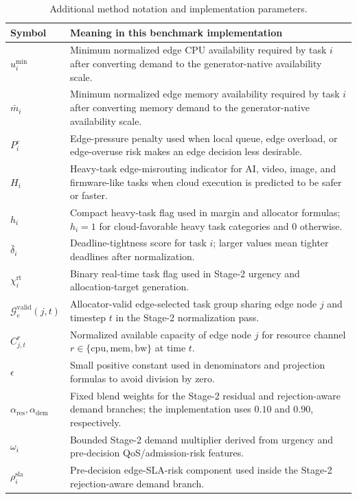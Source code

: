 \begin{table}[!t]
\centering
\caption{Additional method notation and implementation parameters.}
\label{tab:method_parameters}
\scriptsize
\begin{tabularx}{\textwidth}{@{}lX@{}}
\toprule
Symbol & Meaning in this benchmark implementation \\
\midrule
$u_i^{\min}$ & Minimum normalized edge CPU availability required by task $i$ after converting demand to the generator-native availability scale. \\
$\bar{m}_i$ & Minimum normalized edge memory availability required by task $i$ after converting memory demand to the generator-native availability scale. \\
$P_i^e$ & Edge-pressure penalty used when local queue, edge overload, or edge-overuse risk makes an edge decision less desirable. \\
$H_i$ & Heavy-task edge-misrouting indicator for AI, video, image, and firmware-like tasks when cloud execution is predicted to be safer or faster. \\
$h_i$ & Compact heavy-task flag used in margin and allocator formulas; $h_i=1$ for cloud-favorable heavy task categories and $0$ otherwise. \\
$\bar{\delta}_i$ & Deadline-tightness score for task $i$; larger values mean tighter deadlines after normalization. \\
$\chi_i^{\mathrm{rt}}$ & Binary real-time task flag used in Stage-2 urgency and allocation-target generation. \\
$\mathcal{G}^{\mathrm{valid}}_e(j,t)$ & Allocator-valid edge-selected task group sharing edge node $j$ and timestep $t$ in the Stage-2 normalization pass. \\
$C^r_{j,t}$ & Normalized available capacity of edge node $j$ for resource channel $r\in\{\mathrm{cpu},\mathrm{mem},\mathrm{bw}\}$ at time $t$. \\
$\epsilon$ & Small positive constant used in denominators and projection formulas to avoid division by zero. \\
$\alpha_{\mathrm{res}},\alpha_{\mathrm{dem}}$ & Fixed blend weights for the Stage-2 residual and rejection-aware demand branches; the implementation uses $0.10$ and $0.90$, respectively. \\
$\omega_i$ & Bounded Stage-2 demand multiplier derived from urgency and pre-decision QoS/admission-risk features. \\
$\rho_i^{\mathrm{sla}}$ & Pre-decision edge-SLA-risk component used inside the Stage-2 rejection-aware demand branch. \\

\end{tabularx}
\end{table}
